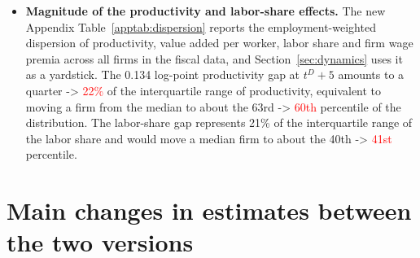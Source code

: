 \documentclass[11pt]{article}
\begin{document}
{\begin{itemize}[leftmargin=*]
\item \textbf{Magnitude of the productivity and labor-share effects.} The new Appendix Table~\ref{apptab:dispersion} reports the employment-weighted dispersion of productivity, value added per worker, labor share and firm wage premia across all firms in the fiscal data, and Section~\ref{sec:dynamics} uses it as a yardstick. The 0.134 log-point productivity gap at $t^D+5$ amounts to a quarter -> \textcolor{red}{22\%} of the interquartile range of productivity, equivalent to moving a firm from the median to about the 63rd -> \textcolor{red}{60th} percentile of the distribution. The labor-share gap represents 21\% of the interquartile range of the labor share and would move a median firm to about the 40th -> \textcolor{red}{41st} percentile.
\end{itemize}}\par


\section*{Main changes in estimates between the two versions}
\end{document}
